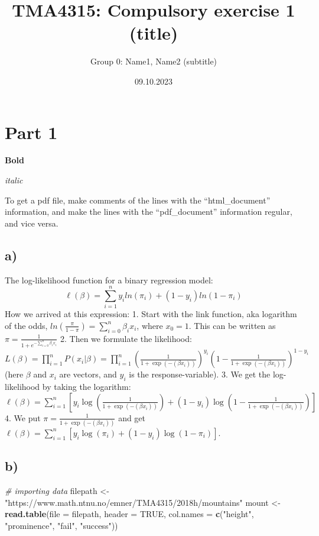 \documentclass[
]{article}
\title{TMA4315: Compulsory exercise 1 (title)}
\subtitle{Group 0: Name1, Name2 (subtitle)}
\author{}
\date{\vspace{-2.5em}09.10.2023}
\newenvironment{Shaded}{\begin{snugshade}}{\end{snugshade}}
\newcommand{\AttributeTok}[1]{\textcolor[rgb]{0.13,0.29,0.53}{#1}}
\newcommand{\CommentTok}[1]{\textcolor[rgb]{0.56,0.35,0.01}{\textit{#1}}}
\newcommand{\ConstantTok}[1]{\textcolor[rgb]{0.56,0.35,0.01}{#1}}
\newcommand{\FunctionTok}[1]{\textcolor[rgb]{0.13,0.29,0.53}{\textbf{#1}}}
\newcommand{\NormalTok}[1]{#1}
\newcommand{\OtherTok}[1]{\textcolor[rgb]{0.56,0.35,0.01}{#1}}
\newcommand{\StringTok}[1]{\textcolor[rgb]{0.31,0.60,0.02}{#1}}
\begin{document}
\maketitle

\hypertarget{part-1}{%
\section{Part 1}\label{part-1}}

\textbf{Bold}

\emph{italic}

To get a pdf file, make comments of the lines with the ``html\_document''
information, and make the lines with the ``pdf\_document'' information regular,
and vice versa.

\hypertarget{a}{%
\subsection{a)}\label{a}}

The log-likelihood function for a binary regression model:
\[\ell(\beta) = \sum_{i=1}^n y_i ln(\pi_i) + (1-y_i)ln(1-\pi_i)\]
How we arrived at this expression:
1. Start with the link function, aka logarithm of the odds, \(ln(\frac{\pi}{1-\pi}) = \sum_{i=0}^n \beta_i x_{i}\), where \(x_0=1\). This can be written as \(\pi = \frac{1}{1+e^{-\sum_{i=0}^n \beta_i x_{i}}}\)
2. Then we formulate the likelihood: \(L(\beta) = \prod_{i=1}^n P(x_i | \beta) = \prod_{i=1}^n \left(\frac{1}{1 + \exp(-(\beta x_i))}\right)^{y_i} \left(1 - \frac{1}{1 + \exp(-(\beta x_i))}\right)^{1-y_i}\) (here \(\beta\) and \(x_i\) are vectors, and \(y_i\) is the response-variable).
3. We get the log-likelihood by taking the logarithm: \(\ell(\beta) = \sum_{i=1}^n \left[ y_i \log\left(\frac{1}{1 + \exp(-(\beta x_i))}\right) + (1 - y_i) \log\left(1 - \frac{1}{1 + \exp(-(\beta x_i))}\right) \right]\)
4. We put \(\pi = \frac{1}{1 + \exp(-(\beta x_i))}\) and get \(\ell(\beta) = \sum_{i=1}^n \left[ y_i \log\left(\pi_i\right) + (1 - y_i) \log\left(1 - \pi_i\right) \right]\).

\hypertarget{b}{%
\subsection{b)}\label{b}}

\begin{Shaded}
\begin{Highlighting}[]
\CommentTok{\# importing data}
\NormalTok{filepath }\OtherTok{\textless{}{-}} \StringTok{"https://www.math.ntnu.no/emner/TMA4315/2018h/mountains"}
\NormalTok{mount }\OtherTok{\textless{}{-}} \FunctionTok{read.table}\NormalTok{(}\AttributeTok{file =}\NormalTok{ filepath, }\AttributeTok{header =} \ConstantTok{TRUE}\NormalTok{, }\AttributeTok{col.names =} \FunctionTok{c}\NormalTok{(}\StringTok{"height"}\NormalTok{,}
    \StringTok{"prominence"}\NormalTok{, }\StringTok{"fail"}\NormalTok{, }\StringTok{"success"}\NormalTok{))}
\end{Highlighting}
\end{Shaded}
\end{document}

